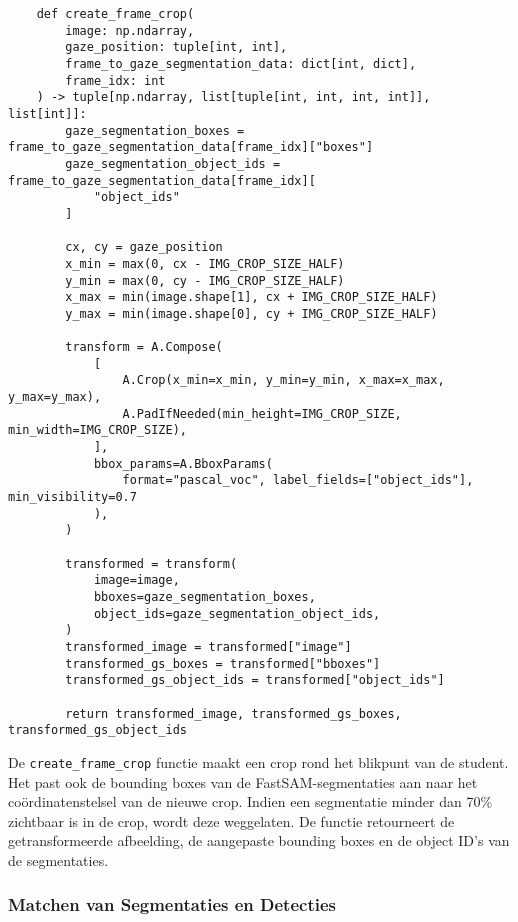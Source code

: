 \begin{listing}[H]
  \fontsize{12pt}{10pt}
  \begin{verbatim}
    def create_frame_crop(
        image: np.ndarray,
        gaze_position: tuple[int, int],
        frame_to_gaze_segmentation_data: dict[int, dict],
        frame_idx: int
    ) -> tuple[np.ndarray, list[tuple[int, int, int, int]], list[int]]:
        gaze_segmentation_boxes = frame_to_gaze_segmentation_data[frame_idx]["boxes"]
        gaze_segmentation_object_ids = frame_to_gaze_segmentation_data[frame_idx][
            "object_ids"
        ]

        cx, cy = gaze_position
        x_min = max(0, cx - IMG_CROP_SIZE_HALF)
        y_min = max(0, cy - IMG_CROP_SIZE_HALF)
        x_max = min(image.shape[1], cx + IMG_CROP_SIZE_HALF)
        y_max = min(image.shape[0], cy + IMG_CROP_SIZE_HALF)

        transform = A.Compose(
            [
                A.Crop(x_min=x_min, y_min=y_min, x_max=x_max, y_max=y_max),
                A.PadIfNeeded(min_height=IMG_CROP_SIZE, min_width=IMG_CROP_SIZE),
            ],
            bbox_params=A.BboxParams(
                format="pascal_voc", label_fields=["object_ids"], min_visibility=0.7
            ),
        )

        transformed = transform(
            image=image,
            bboxes=gaze_segmentation_boxes,
            object_ids=gaze_segmentation_object_ids,
        )
        transformed_image = transformed["image"]
        transformed_gs_boxes = transformed["bboxes"]
        transformed_gs_object_ids = transformed["object_ids"]

        return transformed_image, transformed_gs_boxes, transformed_gs_object_ids
  \end{verbatim}
  \caption[Functie voor het creëren van een crop rond het blikpunt van de student]{
    \label{listing:create-frame-crop}
    De \texttt{create\_frame\_crop} functie maakt een crop rond het blikpunt van de student.
    Het past ook de bounding boxes van de FastSAM-segmentaties aan naar het coördinatenstelsel van de nieuwe crop.
    Indien een segmentatie minder dan 70\% zichtbaar is in de crop, wordt deze weggelaten.
    De functie retourneert de getransformeerde afbeelding, de aangepaste bounding boxes en de object ID's van de segmentaties.
    }
\end{listing}

\subsubsection{Matchen van Segmentaties en Detecties}

